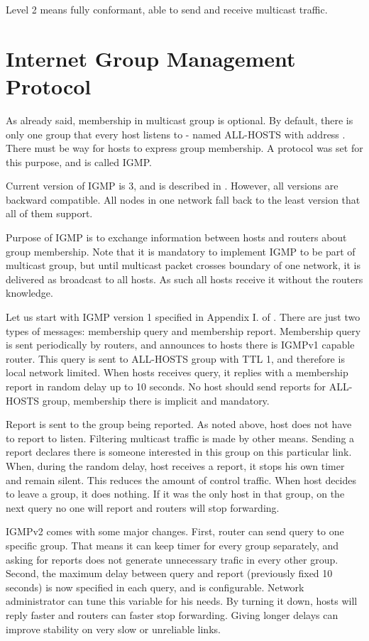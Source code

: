 Level 2 means fully conformant, able to send and receive multicast traffic.

\section{Internet Group Management Protocol}

As already said, membership in multicast group is optional. By default, there
is only one group that every host listens to - named ALL-HOSTS with address
. There must be way for hosts to express group membership.
A protocol was set for this purpose, and is called IGMP.

Current version of IGMP is 3, and is described in . However, all
versions are backward compatible. All nodes in one network fall back to the
least version that all of them support.

Purpose of IGMP is to exchange information between hosts and routers about
group membership. Note that it is mandatory to implement IGMP to be part of
multicast group, but until multicast packet crosses boundary of one network, it
is delivered as broadcast to all hosts. As such all hosts receive it without
the routers knowledge.

Let us start with IGMP version 1 specified in Appendix I. of . There
are just two types of messages: membership query and membership report.
Membership query is sent periodically by routers, and announces to hosts there
is IGMPv1 capable router. This query is sent to ALL-HOSTS group with TTL 1, and
therefore is local network limited. When hosts receives query, it replies with
a membership report in random delay up to 10 seconds. No host should send
reports for ALL-HOSTS group, membership there is implicit and mandatory.

Report is sent to the group being reported. As noted above, host does not have
to report to listen. Filtering multicast traffic is made by other means.
Sending a report declares there is someone interested in this group on this
particular link. When, during the random delay, host receives a report, it
stops his own timer and remain silent. This reduces the amount of control
traffic. When host decides to leave a group, it does nothing. If it was the
only host in that group, on the next query no one will report and routers will
stop forwarding.

IGMPv2 \cite{rfc2236} comes with some major changes. First, router can send
query to one specific group. That means it can keep timer for every group
separately, and asking for reports does not generate unnecessary trafic in
every other group. Second, the maximum delay between query and report
(previously fixed 10 seconds) is now specified in each query, and is
configurable. Network administrator can tune this variable for his needs. By
turning it down, hosts will reply faster and routers can faster stop
forwarding. Giving longer delays can improve stability on very slow or
unreliable links.


